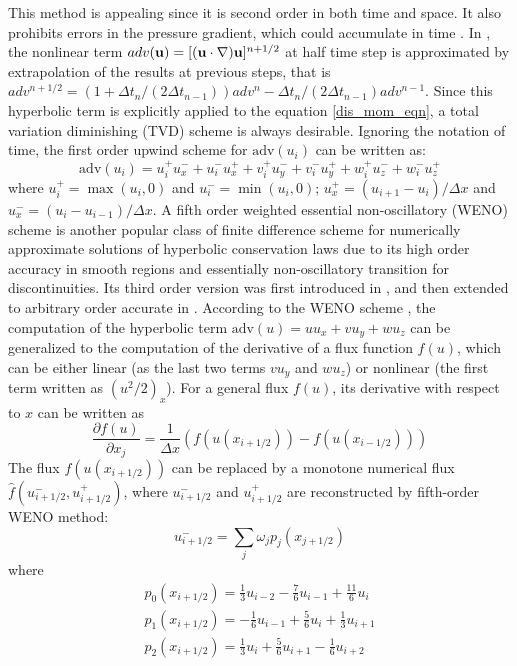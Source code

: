 This method is appealing since it is second order in both time and space. It also prohibits errors in the pressure gradient, which could accumulate in time \cite{Guermond2006Overview}. In , the nonlinear term $adv(\mathbf{u}) = [(\mathbf{u}\cdot\nabla)\mathbf{u}]^{n+1/2}$ at half time step is approximated by extrapolation of the results at previous steps, that is $adv^{n+1/2} = (1+\Delta t_n/(2\Delta t_{n-1}))adv^{n} -\Delta t_n/(2\Delta t_{n-1})adv^{n-1}$. Since this hyperbolic term is explicitly applied to the equation \ref{dis_mom_eqn}, a total variation diminishing (TVD) scheme is always desirable. Ignoring the notation of time, the first order upwind scheme for $\text{adv}(u_i)$ can be written as:
\begin{equation}
\text{adv}(u_i) = u_i^+ u_x^- + u_i^- u_x^+ 
	  + v_i^+ u_y^- + v_i^- u_y^+
	  + w_i^+ u_z^- + w_i^- u_z^+
\label{upwind_adv}
\end{equation}
where $u_i^+ = \max(u_i, 0)$ and $u_i^- = \min(u_i, 0)$; $u_x^+ = (u_{i+1}-u_{i})/\Delta x$ and $u_x^- = (u_i - u_{i-1})/\Delta x$.
A fifth order weighted essential non-oscillatory (WENO) scheme is another popular class of finite difference scheme for numerically approximate solutions of hyperbolic conservation laws due to its high order accuracy in smooth regions and essentially non-oscillatory transition for discontinuities. Its third order version was first introduced in \cite{Liu1994Weighted}, and then extended to arbitrary order accurate in \cite{Jiang1996Efficient}. According to the WENO scheme \cite{Jiang1996Efficient}, the computation of the hyperbolic term $\text{adv}(u) = uu_x + vu_y + wu_z$ can be generalized to the computation of the derivative of a flux function $f(u)$, which can be either linear (as the last two terms 
$vu_y$ and $wu_z$) or nonlinear (the first term written as $(u^2/2)_x$).
For a general flux $f(u)$, its derivative with respect to $x$ can be written as 
\begin{equation}
\frac{\partial f(u)}{\partial x_j} = \frac{1}{\Delta x}(f(u(x_{i+1/2})) - f(u(x_{i-1/2})))
\end{equation}
The flux $f(u(x_{i+1/2}))$ can be replaced by a monotone numerical flux $\hat{f}(u^-_{i+1/2}, u^+_{i+1/2})$, where $u^-_{i+1/2}$ and $u^+_{i+1/2}$ are reconstructed by fifth-order WENO method:
\begin{equation}
u^-_{i+1/2} = \sum_j\omega_jp_j(x_{j+1/2})
\end{equation}
where
\begin{eqnarray}
p_0(x_{i+1/2}) = \frac{1}{3}u_{i-2} - \frac{7}{6}u_{i-1} + \frac{11}{6}u_{i}\\
p_1(x_{i+1/2}) = -\frac{1}{6}u_{i-1} + \frac{5}{6}u_i + \frac{1}{3}u_{i+1}\\
p_2(x_{i+1/2}) = \frac{1}{3}u_i + \frac{5}{6}u_{i+1} - \frac{1}{6}u_{i+2}
\end{eqnarray}

